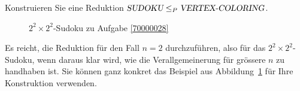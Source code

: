 Konstruieren Sie eine Reduktion
$\textsl{SUDOKU}\le_P\textsl{VERTEX-COLORING}$.

\begin{figure}
\begin{center}
\end{center}
\caption{$2^2\times 2^2$-Sudoku zu Aufgabe \ref{70000028}
\label{70000028:sudoku}}
\end{figure}

\begin{hinweis}
Es reicht, die Reduktion für den Fall $n=2$ durchzuführen, also für
das $2^2\times 2^2$-Sudoku, wenn daraus klar
wird, wie die Verallgemeinerung für grössere $n$ zu handhaben ist.
Sie können ganz konkret das Beispiel aus Abbildung~\ref{70000028:sudoku}
für Ihre Konstruktion verwenden.
\end{hinweis}

